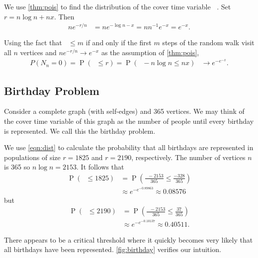 \documentclass[12pt]{article}
\theoremstyle{definition}
\DeclareMathOperator{\pr}{\mathrm{P}}		     %
\DeclareMathOperator{\cov}{\uptau_\textrm{cov}}  %
\begin{document}
We use \cref{thm:pois} to find the distribution of the cover time variable $\cov$.
Set $r = n \log n + nx$.
Then 
\begin{align}
ne^{-r/n} &= n e ^{- \log n - x} = n n ^{-1} e^ {- x} = e^{-x}.\nonumber
\end{align}

Using the fact that $\cov \leq m$ if and only if the first $m$ steps
of the random walk visit all $n$ vertices
and $ne^{-r/n} \rightarrow e^{-x}$ as the assumption of \cref{thm:pois},
\begin{align}
P(N_n=0) = \pr(\cov \leq r) = \pr(\cov - n \log n\leq nx) 
&\rightarrow e^{-e^{-x}}. \label{eqn:dist}
\end{align}

\subsection{Birthday Problem}\label{sec:birthday}
Consider a complete graph (with self-edges) and 365 vertices.
We may think of the cover time variable of this graph as the number of people
until every birthday is represented.
We call this the birthday problem.

We use \cref{eqn:dist} to calculate the probability
that all birthdays are represented in populations of 
size $r=1825$ and $r=2190$, respectively.
The number of vertices $n$ is 365 so $n\log n = 2153$.
It follows that 
\begin{align}
\pr(\cov \leq 1825) &= \pr \left(\frac{\cov - 2153}{365} \leq
\frac{-328}{365}\right) \nonumber \\
&\approx e^{-e^{-0.89863}} \approx 0.08576 \nonumber
\end{align}
but
\begin{align}
\pr(\cov \leq 2190) &= \pr \left(\frac{\cov - 2153}{365} \leq
\frac{37}{365}\right) \nonumber \\
&\approx e^{-e^{-0.10137}} \approx 0.40511. \nonumber
\end{align}

There appears to be a critical threshold where it quickly becomes very likely
that all birthdays have been represented.
\cref{fig:birthday} verifies our intuition.
\end{document}
